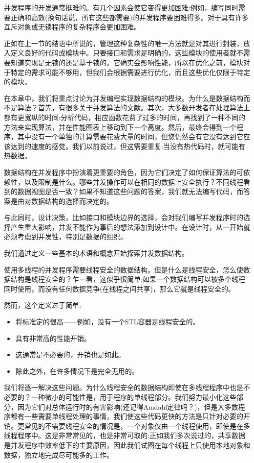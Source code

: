 
并发程序的开发通常挺难的。有几个因素会使它变得更加困难:例如，编写同时需要正确和高效(换句话说，所有这些都需要)的并发程序要困难得多。对于具有许多互斥对象或无锁程序的复杂程序会更加困难。

正如在上一节的结语中所说的，管理这种复杂性的唯一方法就是对其进行封装，放入定义良好的代码或模块中。只要接口和需求是明确的，这些模块的使用者就不需要知道实现是无锁的还是基于锁的。它确实会影响性能，所以在优化之前，模块对于特定的需求可能不够用，但我们会根据需要进行优化，而且这些优化仅限于特定的模块。

在本章中，我们将重点讨论为并发编程实现数据结构的模块。为什么是数据结构而不是算法？首先，有很多关于并发算法的文献。其次，大多数开发者在处理算法上都有更宽纵的时间:分析代码，相应函数花费了过多的时间，再找到了一种不同的方法来实现算法，并在性能图表上移动到下一个高度。然后，最终会得到一个程序，其中没有一个单独的计算需要花费大量的时间，但您仍然会有它没有达到它应该达到的速度的感觉。我们以前说过，但这需要重复:当没有热代码时，就可能有热数据。

数据结构在并发程序中扮演着更重要的角色，因为它们决定了如何保证算法的可依赖性，以及限制是什么。哪些并发操作可以在相同的数据上安全执行？不同线程看到的数据视图是否一致？如果不知道这些问题的答案，我们就无法编写代码，而答案是由对数据结构的选择而决定的。

与此同时，设计决策，比如接口和模块边界的选择，会对我们编写并发程序时的选择产生重大影响，并发不能作为事后的想法添加到设计中。在设计时，从一开始就必须考虑到并发性，特别是数据的组织。

我们通过定义一些基本的术语和概念开始探索并发数据结构。


使用多线程的并发程序需要线程安全的数据结构。但是什么是线程安全，怎么使数据结构是线程安全的？乍一看，这似乎很简单:如果一个数据结构可以被多个线程同时使用，而没有任何数据竞争(在线程之间共享)，那么它就是线程安全的。

然而，这个定义过于简单:

\begin{itemize}
\item 将标准定的很高——例如，没有一个STL容器是线程安全的。
\item 具有非常高的性能开销。
\item 这通常是不必要的，开销也是如此。
\item 除此之外，在许多情况下是完全无用的。
\end{itemize}

我们将逐一解决这些问题。为什么线程安全的数据结构即使在多线程程序中也是不必要的？一种微小的可能性是，用于程序的单线程部分。我们努力最小化这些部分，因为它们对总体运行时的有害影响(还记得Amdahl定律吗？)，但是大多数程序都有一些需要单线程处理的事情，我们使这些代码更快的方法是只针对必要的开销。更常见的不需要线程安全的情况是，一个对象仅由一个线程使用，即使是在多线程程序中。这是非常常见的，也是非常可取的:正如我们多次说过的，共享数据是并发程序中效率低下的主要原因，因此我们试图在每个线程上只使用本地对象和数据，独立地完成尽可能多的工作。

